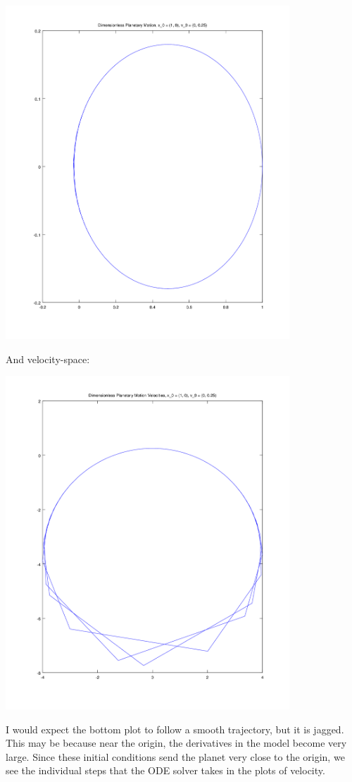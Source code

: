 \documentclass{article}
\begin{document}
\includegraphics[width=0.8\textwidth]{plots/planet-motion.png}

And velocity-space:

\includegraphics[width=0.8\textwidth]{plots/velocity-planet-motion.png}

I would expect the bottom plot to follow a smooth trajectory, but it is
	jagged.
This may be because near the origin, the derivatives in the model
	become very large.
Since these initial conditions send the planet very close to the origin,
	we see the individual steps that the ODE solver takes in the plots 
	of velocity.
\end{document}
